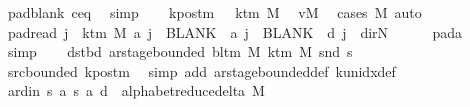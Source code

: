 \begin{isabellebody}
\ pad{\isacharunderscore}{\kern0pt}blank\ c{\isacharprime}{\kern0pt}{\isacharunderscore}{\kern0pt}eq\ \isamarkupfalse%
\ simp\isanewline
\ \ \isamarkupfalse%
\ kpos{\isacharunderscore}{\kern0pt}tm{\isacharcolon}{\kern0pt}\ {\isachardoublequoteopen}{}\ {\isacharless}{\kern0pt}\ k{\isacharunderscore}{\kern0pt}tm\ M{\isachardoublequoteclose}\ \isamarkupfalse%
\ vM\ \isamarkupfalse%
\ {\isacharparenleft}{\kern0pt}cases\ M{\isacharparenright}{\kern0pt}\ auto\isanewline
\ \ \isamarkupfalse%
\ pad{\isacharunderscore}{\kern0pt}read{\isacharcolon}{\kern0pt}\ {\isachardoublequoteopen}{\isasymforall}j\ {\isasymge}\ k{\isacharunderscore}{\kern0pt}tm\ M{\isachardot}{\kern0pt}\ {\isacharquery}{\kern0pt}a\ j\ {\isacharequal}{\kern0pt}\ BLANK{}\ {\isasymand}\ {\isacharquery}{\kern0pt}a\ j\ {\isacharequal}{\kern0pt}\ BLANK{}\ {\isasymand}\ {\isacharquery}{\kern0pt}d\ j\ {\isacharequal}{\kern0pt}\ dir{\isachardot}{\kern0pt}N{\isachardoublequoteclose}\isanewline
\ \ \ \ \isamarkupfalse%
\ pad{\isacharunderscore}{\kern0pt}a\ \isamarkupfalse%
\ simp\isanewline
\ \ \isamarkupfalse%
\ dst{\isacharunderscore}{\kern0pt}bd{\isacharcolon}{\kern0pt}\ {\isachardoublequoteopen}ar{\isacharunderscore}{\kern0pt}stage{\isacharunderscore}{\kern0pt}bounded\ {\isacharparenleft}{\kern0pt}bl{\isacharunderscore}{\kern0pt}tm\ M{\isacharparenright}{\kern0pt}\ {\isacharparenleft}{\kern0pt}k{\isacharunderscore}{\kern0pt}tm\ M{\isacharparenright}{\kern0pt}\ {\isacharparenleft}{\kern0pt}snd\ {\isacharquery}{\kern0pt}s{\isacharprime}{\kern0pt}{\isacharparenright}{\kern0pt}{\isachardoublequoteclose}\isanewline
\ \ \ \ \isamarkupfalse%
\ src{\isacharunderscore}{\kern0pt}bounded\ kpos{\isacharunderscore}{\kern0pt}tm\ \isamarkupfalse%
\ {\isacharparenleft}{\kern0pt}simp\ add{\isacharcolon}{\kern0pt}\ ar{\isacharunderscore}{\kern0pt}stage{\isacharunderscore}{\kern0pt}bounded{\isacharunderscore}{\kern0pt}def\ k{\isacharunderscore}{\kern0pt}unidx{\isacharunderscore}{\kern0pt}def{\isacharparenright}{\kern0pt}\isanewline
\ \ \isamarkupfalse%
\ ard{\isacharunderscore}{\kern0pt}in{\isacharcolon}{\kern0pt}\ {\isachardoublequoteopen}{\isacharparenleft}{\kern0pt}{\isacharquery}{\kern0pt}s{\isacharcomma}{\kern0pt}\ {\isacharquery}{\kern0pt}a{\isacharcomma}{\kern0pt}\ {\isacharquery}{\kern0pt}s{\isacharprime}{\kern0pt}{\isacharcomma}{\kern0pt}\ {\isacharquery}{\kern0pt}a{\isacharcomma}{\kern0pt}\ {\isacharquery}{\kern0pt}d{\isacharparenright}{\kern0pt}\ {\isasymin}\ alphabet{\isacharunderscore}{\kern0pt}reduce{\isacharunderscore}{\kern0pt}delta\ M{\isachardoublequoteclose}\isanewline

\end{isabellebody}
